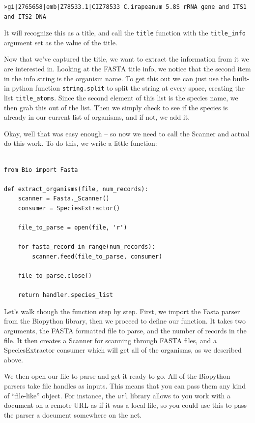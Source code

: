 \documentclass{report}
\begin{document}
\begin{verbatim}
>gi|2765658|emb|Z78533.1|CIZ78533 C.irapeanum 5.8S rRNA gene and ITS1 and ITS2 DNA
\end{verbatim}

It will recognize this as a title, and call the \verb|title| function with the \verb|title_info| argument set as the value of the title.


Now that we've captured the title, we want to extract the information from it we are interested in. Looking at the FASTA title info, we notice that the second item in the info string is the organism name. To get this out we can just use the built-in python function \verb|string.split| to split the string at every space, creating the list \verb|title_atoms|. Since the second element of this list is the species name, we then grab this out of the list. Then we simply check to see if the species is already in our current list of organisms, and if not, we add it.


Okay, well that was easy enough -- so now we need to call the Scanner and actual do this work. To do this, we write a little function:

\begin{verbatim}

from Bio import Fasta

def extract_organisms(file, num_records):
    scanner = Fasta._Scanner()
    consumer = SpeciesExtractor()

    file_to_parse = open(file, 'r')

    for fasta_record in range(num_records):
        scanner.feed(file_to_parse, consumer)

    file_to_parse.close()

    return handler.species_list

\end{verbatim}

Let's walk though the function step by step. First, we import the Fasta parser from the Biopython library, then we proceed to define our function. It takes two arguments, the FASTA formatted file to parse, and the number of records in the file. It then creates a Scanner for scanning through FASTA files, and a SpeciesExtractor consumer which will get all of the organisms, as we described above.

We then open our file to parse and get it ready to go. All of the Biopython parsers take file handles as inputs. This means that you can pass them any kind of ``file-like'' object. For instance, the \verb|url| library allows to you work with a document on a remote URL as if it was a local file, so you could use this to pass the parser a document somewhere on the net.
\end{document}
